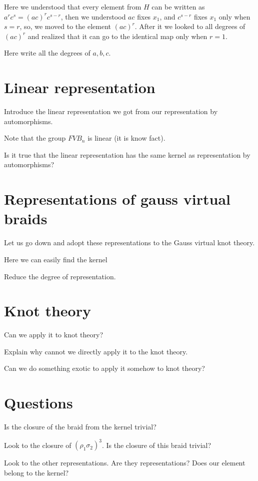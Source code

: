 \documentclass{article}
\begin{document}
Here we understood that every element from $H$ can be written as $a^rc^s=(ac)^rc^{s-r}$, then we understood $ac$ fixes $x_1$, and $c^{s-r}$ fixes $x_1$ only when $s=r$, so, we moved to the element $(ac)^r$. After it we looked to all degrees of $(ac)^r$ and realized that it can go to the identical map only when $r=1$. 

Here write all the degrees of $a,b,c$.
\section{Linear representation}
Introduce the linear representation we got from our representation by automorphisms.

Note that the group $FVB_n$ is linear (it is know fact).

Is it true that the linear representation has the same kernel as representation by automorphisms?

\section{Representations of gauss virtual braids}
Let us go down and adopt these representations to the Gauss virtual knot theory.

Here we can easily find the kernel

Reduce the degree of representation.
\section{Knot theory}
Can we apply it to knot theory?

Explain why cannot we directly apply it to the knot theory.

Can we do something exotic to apply it somehow to knot theory?

\section{Questions}
Is the closure of the braid from the kernel trivial?

Look to the closure of $(\rho_1\sigma_2)^3$. Is the closure of this braid trivial?

Look to the other representations. Are they representations? Does our element belong to the kernel?
\end{document}
